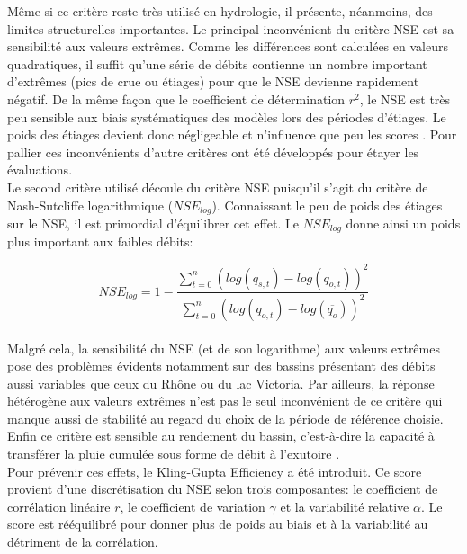 Même si ce critère reste très utilisé en hydrologie, il présente, néanmoins, des limites structurelles importantes. Le principal inconvénient du critère NSE est sa sensibilité aux valeurs extrêmes. Comme les différences sont calculées en valeurs quadratiques, il suffit qu'une série de débits contienne un nombre important d'extrêmes (pics de crue ou étiages) pour que le NSE devienne rapidement négatif. De la même façon que le coefficient de détermination $r^{2}$, le NSE est très peu sensible aux biais systématiques des modèles lors des périodes d'étiages\citep{krause2005}. Le poids des étiages devient donc négligeable et n'influence que peu les scores \citep{legates1999}. Pour pallier ces inconvénients d'autre critères ont été développés pour étayer les évaluations.\\

Le second critère utilisé découle du critère NSE puisqu'il s'agit du critère de Nash-Sutcliffe logarithmique ($NSE_{log}$). Connaissant le peu de poids des étiages sur le NSE, il est primordial d'équilibrer cet effet. Le $NSE_{log}$ donne ainsi un poids plus important aux faibles débits:

\begin{equation}
NSE_{log}= 1 - \frac{\sum\limits_{t=0}^n(log(q_{s,t})-log(q_{o,t}))^{2}}{\sum\limits_{t=0}^n(log(q_{o,t})-log(\overline{q_{o}}))^{2}}
\end{equation}
\\

Malgré cela, la sensibilité du NSE (et de son logarithme) aux valeurs extrêmes pose des problèmes évidents notamment sur des bassins présentant des débits aussi variables que ceux du Rhône ou du lac Victoria. Par ailleurs, la réponse hétérogène aux valeurs extrêmes n'est pas le seul inconvénient de ce critère qui manque aussi de stabilité au regard du choix de la période de référence choisie. Enfin ce critère est sensible au rendement du bassin, c'est-à-dire la capacité à transférer la pluie cumulée sous forme de débit à l'exutoire \citep{perrin2000}.\\

Pour prévenir ces effets, le Kling-Gupta Efficiency \citep[KGE,][]{gupta2009, kling2012} a été introduit. Ce score provient d'une discrétisation du NSE selon trois composantes: le coefficient de corrélation linéaire $r$, le coefficient de variation $\gamma$ et la variabilité relative $\alpha$. Le score est rééquilibré pour donner plus de poids au biais et à la variabilité au détriment de la corrélation.

